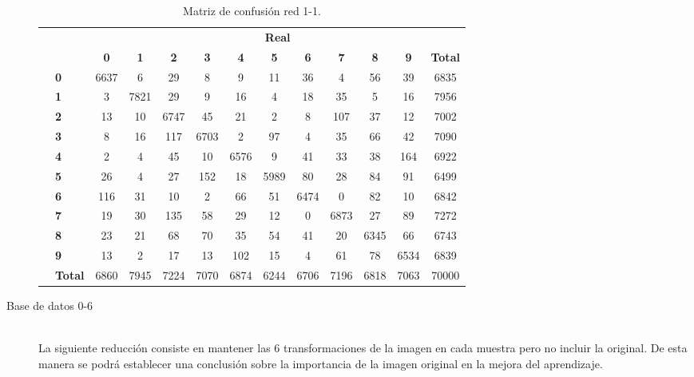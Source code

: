 \begin{description}
\begin{table}[H]
\begin{tabular}{|c|l|c|c|c|c|c|c|c|c|c|c|c|}
			\multicolumn{2}{c|}{} & \multicolumn{11}{c|}{\textbf{Real}} \\ \cline{3-13} 
			\multicolumn{2}{c|}{} & \textbf{0} & \textbf{1} & \textbf{2} &  \textbf{3} & \textbf{4} & \textbf{5} & \textbf{6} & \textbf{7} & \textbf{8} & \textbf{9} & \textbf{Total}\\ \hline
			\multirow{10}{0.5cm}{\rotatebox{90}{\textbf{Predicción}}}& \textbf{0} & \cellcolor{lightgray}6637 & 6 & 29 & 8 & 9 & 11 & 36 & 4 & 56 & 39 & 6835\\ \cline{2-13}
			& \textbf{1} & 3 & \cellcolor{lightgray}7821 & 29 & 9 & 16 & 4 & 18 & 35 & 5 & 16 & 7956\\ \cline{2-13}
			& \textbf{2} & 13 & 10 & \cellcolor{lightgray}6747 & 45 & 21 & 2 & 8 & 107 & 37 & 12 & 7002\\ \cline{2-13}
			& \textbf{3} & 8 & 16 & 117 & \cellcolor{lightgray}6703 & 2 & 97 & 4 & 35 & 66 & 42 & 7090\\ \cline{2-13}
			& \textbf{4} & 2 & 4 & 45 & 10 & \cellcolor{lightgray}6576 & 9 & 41 & 33 & 38 & 164 & 6922\\ \cline{2-13}
			& \textbf{5} & 26 & 4 & 27 & 152 & 18 & \cellcolor{lightgray}5989 & 80 & 28 & 84 & 91 & 6499\\ \cline{2-13}
			& \textbf{6} & 116 & 31 & 10 & 2 & 66 & 51 & \cellcolor{lightgray}6474 & 0 & 82 & 10 & 6842\\ \cline{2-13}
			& \textbf{7} & 19 & 30 & 135 & 58 & 29 & 12 & 0 & \cellcolor{lightgray}6873 & 27 & 89 & 7272\\ \cline{2-13}
			& \textbf{8} & 23 & 21 & 68 & 70 & 35 & 54 & 41 & 20 & \cellcolor{lightgray}6345 & 66 & 6743\\ \cline{2-13}
			& \textbf{9} & 13 & 2 & 17 & 13 & 102 & 15 & 4 & 61 & 78 & \cellcolor{lightgray}6534 & 6839\\ \cline{2-13}
			& \textbf{Total} & 6860 & 7945 & 7224 & 7070 & 6874 & 6244 & 6706 & 7196 & 6818 & 7063 & 70000\\ \hline
		\end{tabular}
		\caption{Matriz de confusión red 1-1.}
		\label{tab.matriz1-1}
	\end{table}
	\item[Base de datos 0-6] \hfill 
	\vspace{10pt}
	\\
	La siguiente reducción consiste en mantener las 6 transformaciones de la imagen en cada muestra pero no incluir la original. De esta manera se podrá establecer una conclusión sobre la importancia de la imagen original en la mejora del aprendizaje.\\
	

\end{description}
